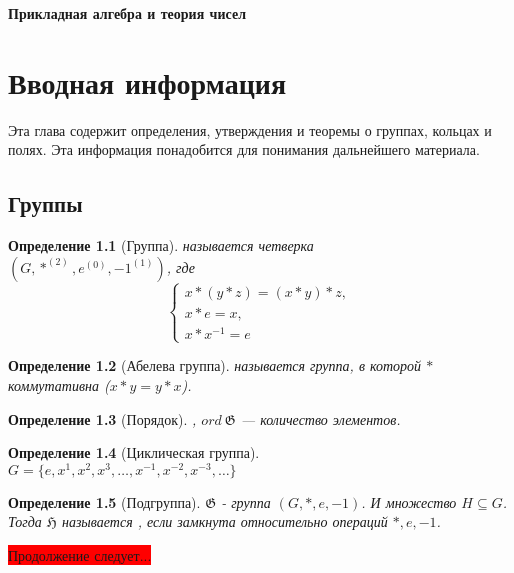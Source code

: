 \documentclass[a4paper,14pt, draft]{report}
\newtheorem{definition}{Определение}
\begin{document}
\begin{titlepage}
\begin{center}
\vspace{5em}

\textbf{\large Прикладная алгебра и теория чисел}
\end{center}
\end{titlepage}
\renewcommand\contentsname{Оглавление}
\setcounter{page}{2}
\tableofcontents\newpage
\chapter{Вводная информация}
Эта глава содержит определения, утверждения и теоремы о группах, кольцах и полях. Эта информация понадобится для понимания дальнейшего материала.
\section{Группы}
\begin{definition}[Группа]
 называется четверка\\$(G, *^{(2)}, e^{(0)}, -1^{(1)})$, где
\[
    \begin{cases}
        x * (y * z) = (x * y) * z,\\
        x * e = x,\\
        x * x^{-1} = e
    \end{cases}
\]
\end{definition}
\begin{definition}[Абелева группа]
 называется группа, в которой $*$ коммутативна ($x * y = y * x$).
\end{definition}
\begin{definition}[Порядок]
, $ord~\mathfrak{G}$ --- количество элементов.
\end{definition}
\begin{definition}[Циклическая группа]
~\\$G = \{e, x^1, x^2, x^3, \ldots, x^{-1}, x^{-2}, x^{-3}, \ldots\}$
\end{definition}
\begin{definition}[Подгруппа]
$\mathfrak{G}$ - группа $(G, *, e, -1)$. И множество $H \subseteq G$. Тогда $\mathfrak{H}$ называется , если замкнута относительно операций $*, e, -1$.
\end{definition}
\colorbox{red}{Продолжение следует...}
\end{document}
